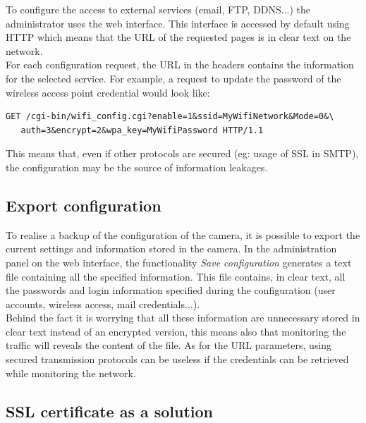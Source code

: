 To configure the access to external services (email, FTP, DDNS...) the administrator uses the web interface.
This interface is accessed by default using HTTP which means that the URL of the requested pages is in clear text on the network.\\

For each configuration request, the URL in the headers contains the information for the selected service.
For example, a request to update the password of the wireless access point credential would look like:
\begin{verbatim}
GET /cgi-bin/wifi_config.cgi?enable=1&ssid=MyWifiNetwork&Mode=0&\
   auth=3&encrypt=2&wpa_key=MyWifiPassword HTTP/1.1
\end{verbatim}

This means that, even if other protocols are secured (eg: usage of SSL in SMTP), the configuration may be the source of information leakages.\\

\subsection{Export configuration}
\label{sec:dcs-config}

To realise a backup of the configuration of the camera, it is possible to export the current settings and information stored in the camera.
In the administration panel on the web interface, the functionality \emph{Save configuration} generates a text file containing all the specified information.
This file contains, in clear text, all the passwords and login information specified during the configuration (user accounts, wireless access, mail credentials...).\\

Behind the fact it is worrying that all these information are unnecessary stored in clear text instead of an encrypted version, this means also that monitoring the traffic will reveals the content of the file.
As for the URL parameters, using secured transmission protocols can be useless if the credentials can be retrieved while monitoring the network.

\subsection{SSL certificate as a solution}


